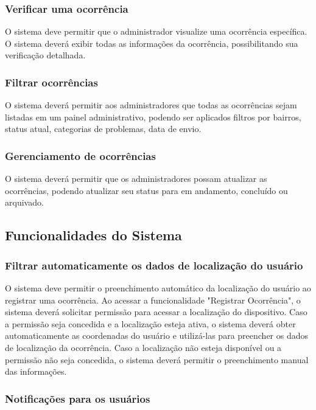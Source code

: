 \subsubsection{Verificar uma ocorrência}

O sistema deve permitir que o administrador visualize uma ocorrência específica. O sistema deverá exibir todas as informações da ocorrência, possibilitando sua verificação detalhada.

\subsubsection{Filtrar ocorrências}

O sistema deverá permitir aos administradores que todas as ocorrências sejam listadas em um painel administrativo, podendo ser aplicados filtros por bairros, status atual, categorias de problemas, data de envio.

\subsubsection{Gerenciamento de ocorrências}

O sistema deverá permitir que os administradores possam atualizar as ocorrências, podendo atualizar seu status para em andamento, concluído ou arquivado.

\subsection{Funcionalidades do Sistema}

\subsubsection{Filtrar automaticamente os dados de localização do usuário}

O sistema deve permitir o preenchimento automático da localização do usuário ao registrar uma ocorrência. Ao acessar a funcionalidade "Registrar Ocorrência", o sistema deverá solicitar permissão para acessar a localização do dispositivo. Caso a permissão seja concedida e a localização esteja ativa, o sistema deverá obter automaticamente as coordenadas do usuário e utilizá-las para preencher os dados de localização da ocorrência. Caso a localização não esteja disponível ou a permissão não seja concedida, o sistema deverá permitir o preenchimento manual das informações.

\subsubsection{Notificações para os usuários}

